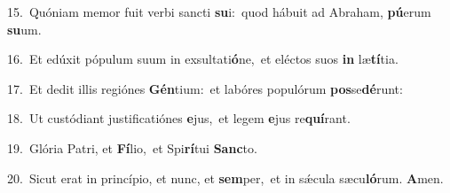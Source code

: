 {\numbfont\textcolor{\numbcolor}{15.}}~Quóniam memor fuit verbi sancti \textbf{su}\-i:~\star quod hábuit ad Abraham, \textbf{pú}\-erum \textbf{su}\-um.\par
{\numbfont\textcolor{\numbcolor}{16.}}~Et edúxit pópulum suum in exsultati\-\textbf{ó}\-ne,~\star et eléctos suos \textbf{in} læ\-\textbf{tí}\-tia.\par
{\numbfont\textcolor{\numbcolor}{17.}}~Et dedit illis regiónes \textbf{Gén}\-tium:~\star et labóres populórum \textbf{pos}\-se\-\textbf{dé}\-runt:\par
{\numbfont\textcolor{\numbcolor}{18.}}~Ut custódiant justificatiónes \textbf{e}\-jus,~\star et legem \textbf{e}\-jus re\-\textbf{quí}\-rant.\par
{\numbfont\textcolor{\numbcolor}{19.}}~Glória Patri, et \textbf{Fí}\-lio,~\star et Spi\-\textbf{rí}\-tui \textbf{Sanc}\-to.\par
{\numbfont\textcolor{\numbcolor}{20.}}~Sicut erat in princípio, et nunc, et \textbf{sem}\-per,~\star et in sǽcula sæcu\-\textbf{ló}\-rum. \textbf{A}\-men.\par
